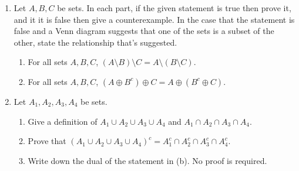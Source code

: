 \documentclass[11 pt]{article}%
\begin{document}
\begin{enumerate}

\newpage
\item   Let $A, B, C$ be sets.  
In each part, if the given statement is true then prove it, and it it is false then give a counterexample. 
In the case that the statement is false and a Venn diagram suggests that one of the sets is a subset of the other, state the relationship that's suggested.
\begin{enumerate}
\item   For all sets $A, B, C$, $(A \setminus B) \setminus C = A \setminus (B \setminus C)$.
\item For all sets $A, B, C$,  $(A \oplus B^c) \oplus C =  A \oplus (B^c \oplus C)$.
\end{enumerate}

\item Let $A_1, A_2, A_3, A_4$ be sets.  
\begin{enumerate}
\item Give a definition of $A_1 \cup A_2 \cup A_3 \cup A_4$ and  $A_1 \cap A_2 \cap A_3 \cap A_4$.
\item Prove that $(A_1 \cup A_2 \cup A_3 \cup A_4)^c = A_1^c \cap A_2^c \cap A_3^c \cap A_4^c$.
\item Write down the dual of the statement in (b).  No proof is required.
\end{enumerate}

\end{enumerate}
\end{document}

